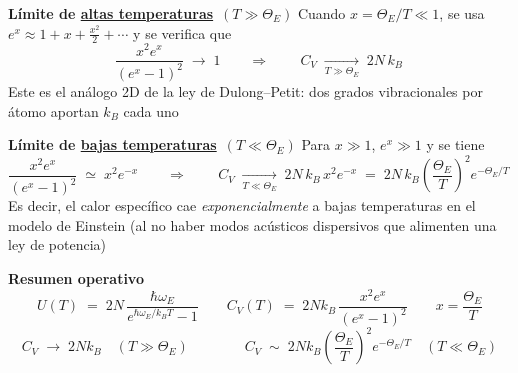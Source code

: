 \documentclass{article}
\begin{document}
\noindent\textbf{Límite de \underline{altas temperaturas}} $\,(T\gg \Theta_E)$\;
Cuando $x=\Theta_E/T \ll 1$, se usa $e^{x}\approx 1+x+\tfrac{x^2}{2}+\cdots$ y se verifica que
\begin{equation}
  \frac{x^{2} e^{x}}{(e^{x}-1)^{2}} \;\longrightarrow\; 1
  \qquad\Rightarrow\qquad
  \boxed{\,C_V \;\xrightarrow[T\gg \Theta_E]{}\; 2N\,k_B\,}
  \label{eq:Cv_altaT}
\end{equation}
Este es el análogo 2D de la ley de Dulong–Petit: dos grados vibracionales por átomo aportan $k_B$ cada uno

\noindent\textbf{Límite de \underline{bajas temperaturas}} $\,(T\ll \Theta_E)$\;
Para $x\gg 1$, $e^{x}\gg 1$ y se tiene
\begin{equation}
  \frac{x^{2} e^{x}}{(e^{x}-1)^{2}}
  \;\simeq\;
  x^{2}e^{-x}
  \qquad\Rightarrow\qquad
  \boxed{\,C_V \;\xrightarrow[T\ll \Theta_E]{}\; 2N\,k_B\,x^{2}e^{-x}
  \;=\; 2N\,k_B\left(\frac{\Theta_E}{T}\right)^{\!2} e^{-\Theta_E/T}\,}
  \label{eq:Cv_bajaT}
\end{equation}
Es decir, el calor específico cae \emph{exponencialmente} a bajas temperaturas en el modelo de Einstein (al no haber modos acústicos dispersivos que alimenten una ley de potencia)

\noindent\textbf{Resumen operativo}\;
\begin{equation}
  U(T) \;=\; 2N\,\frac{\hbar\omega_E}{e^{\hbar\omega_E/k_B T}-1}
  \qquad
  C_V(T) \;=\; 2N k_B \,\frac{x^{2} e^{x}}{(e^{x}-1)^{2}}
  \qquad
  x=\frac{\Theta_E}{T}
  \label{eq:Einstein2D_resumen}
\end{equation}
\begin{equation}
  C_V \;\to\; 2N k_B \quad (T\gg \Theta_E)
  \qquad\qquad
  C_V \;\sim\; 2N k_B \left(\frac{\Theta_E}{T}\right)^2 e^{-\Theta_E/T} \quad (T\ll \Theta_E)
  \label{eq:Einstein2D_resumen_lim}
\end{equation}


\vspace{0.5cm}
\end{document}
